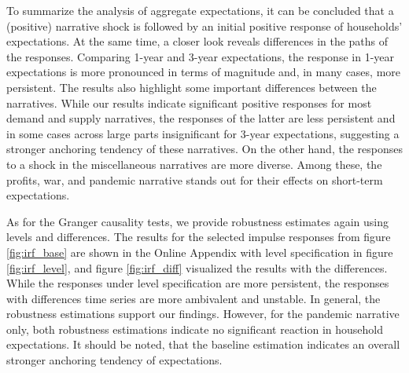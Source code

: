 To summarize the analysis of aggregate expectations, it can be concluded that a (positive) narrative shock is followed by an initial positive response of households' expectations. At the same time, a closer look reveals differences in the paths of the responses. Comparing 1-year and 3-year expectations, the response in 1-year expectations is more pronounced in terms of magnitude and, in many cases, more persistent. The results also highlight some important differences between the narratives. While our results indicate significant positive responses for most demand and supply narratives, the responses of the latter are less persistent and in some cases across large parts insignificant for 3-year expectations, suggesting a stronger anchoring tendency of these narratives. On the other hand, the responses to a shock in the miscellaneous narratives are more diverse. Among these, the profits, war, and pandemic narrative stands out for their effects on short-term expectations.

As for the Granger causality tests, we provide robustness estimates again using levels and differences. The results for the selected impulse responses from figure \ref{fig:irf_base} are shown in the Online Appendix with level specification in figure \ref{fig:irf_level}, and figure \ref{fig:irf_diff} visualized the results with the differences. While the responses under level specification are more persistent, the responses with differences time series are more ambivalent and unstable. In general, the robustness estimations support our findings. However, for the pandemic narrative only, both robustness estimations indicate no significant reaction in household expectations. It should be noted, that the baseline estimation indicates an overall stronger anchoring tendency of expectations.
